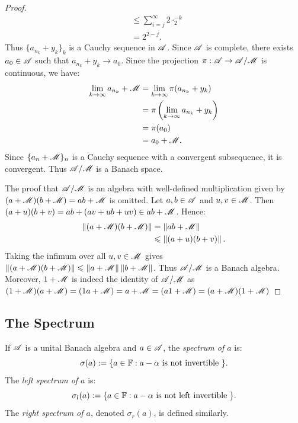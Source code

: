 \documentclass[reqno]{amsart}
\begin{document}
\begin{proof}
\begin{align*}
			&\leq \sum_{i=j}^{\infty} 2\cdot_2^{-k}  \\
			&= 2^{2-j}.
		\end{align*}
		Thus $\{a_{n_k} + y_k\}_k$ is a Cauchy sequence in $\mathscr{A}$. Since $\mathscr{A}$ is complete, there exists $a_0 \in \mathscr{A}$ such that $a_{n_k} + y_k \rightarrow a_0$. Since the projection $\pi:\mathscr{A} \rightarrow \mathscr{A}/\mathscr{M}$ is continuous, we have:
		\begin{align*}
			\lim_{k \rightarrow \infty}a_{n_k} + \mathscr{M}
			&= \lim_{k \rightarrow \infty} \pi(a_{n_k} + y_k) \\
			&= \pi\left(\lim_{k \rightarrow \infty} a_{n_k} + y_k \right) \\
			&= \pi(a_0) \\
			&= a_0 + \mathscr{M}.
		\end{align*}
		Since $\{a_n + \mathscr{M}\}_n$ is a Cauchy sequence with a convergent subsequence, it is convergent. Thus $\mathscr{A}/\mathscr{M}$ is a Banach space.

		The proof that $\mathscr{A}/\mathscr{M}$ is an algebra with well-defined multiplication given by $(a+\mathscr{M})(b+\mathscr{M}) = ab + \mathscr{M}$ is omitted. Let $a,b \in \mathscr{A}$ and $u,v \in \mathscr{M}$. Then $(a+u)(b+v) = ab + (av + ub + uv) \in ab+\mathscr{M}$. Hence:
		\begin{align*}
			\left\lVert (a+\mathscr{M})(b+\mathscr{M}) \right\rVert
			&= \left\lVert ab + \mathscr{M} \right\rVert \\
			&\leqslant \left\lVert (a+u)(b+v) \right\rVert.
		\end{align*}
		Taking the infimum over all $u,v \in \mathscr{M}$ gives $\left\lVert (a+\mathscr{M})(b+\mathscr{M}) \right\rVert \leqslant \left\lVert a+\mathscr{M} \right\rVert \left\lVert b+\mathscr{M} \right\rVert$. Thus $\mathscr{A}/\mathscr{M}$ is a Banach algebra. Moreover, $1 + \mathscr{M}$ is indeed the identity of $\mathscr{A}/\mathscr{M}$ as $(1+\mathscr{M})(a+\mathscr{M}) = (1a + \mathscr{M}) = a + \mathscr{M} = (a1 + \mathscr{M}) = (a + \mathscr{M})(1 + \mathscr{M})$
	\end{proof}

\subsection{The Spectrum}

\begin{definition}
	If $\mathscr{A}$ is a unital Banach algebra and $a \in \mathscr{A}$, the \emph{spectrum of $a$} is:
	\[
		\sigma(a) := \{a \in \mathbb{F} : a - \alpha \text{ is not invertible }\}.
	\] 
	The \emph{left spectrum of $a$} is:
	\[
		\sigma_l(a) := \{a \in \mathbb{F} : a - \alpha \text{ is not left invertible }\}.
	\] 
	The \emph{right spectrum of $a$}, denoted $\sigma_r(a)$, is defined similarly.
\end{definition}
\end{document}
